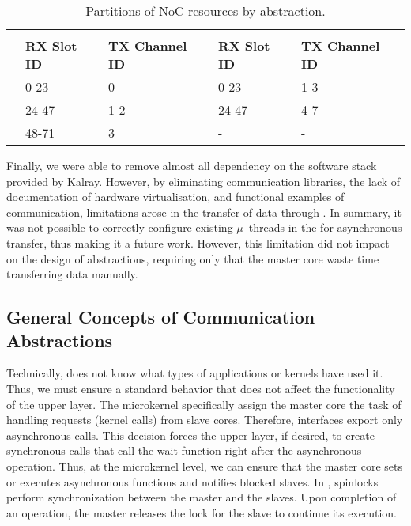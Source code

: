 			\begin{table}[!tb]
				\centering%
				\caption{Partitions of NoC resources by abstraction.}%
				\label{tab.noc-resources}%

				\begin{tabular}{l|l|l|l|l|}
					\cline{2-5}
															& \multicolumn{2}{c|}{\textbf{\cnoc}}          & \multicolumn{2}{c|}{\textbf{\dnoc}}          \\ \cline{2-5}
															& \textbf{RX Slot ID} & \textbf{TX Channel ID} & \textbf{RX Slot ID} & \textbf{TX Channel ID} \\ \hline
					\multicolumn{1}{|l|}{\textbf{\mailbox}} & 0-23                & 0                      & 0-23                & 1-3                    \\ \hline
					\multicolumn{1}{|l|}{\textbf{\portal}}  & 24-47               & 1-2                    & 24-47               & 4-7                    \\ \hline
					\multicolumn{1}{|l|}{\textbf{\sync}}    & 48-71               & 3                      & -                   & -                      \\ \hline
				\end{tabular}

			\end{table}

			Finally, we were able to remove almost all dependency on the software
			stack provided by Kalray. However, by eliminating communication
			libraries, the lack of documentation of hardware virtualisation,
			and functional examples of communication, limitations arose
			in the transfer of data through \dnoc. In summary, it was not possible
			to correctly configure existing $\mu$~threads in the \dma for asynchronous
			transfer, thus making it a future work. However, this limitation did not
			impact on the design of abstractions, requiring only that the master
			core waste time transferring data manually.

		\subsection{General Concepts of Communication Abstractions}
		\label{sec.general-concepts}

			Technically, \nanvix \hal does not know what types of applications
			or kernels have used it. Thus, we must ensure a standard behavior
			that does not affect the functionality of the upper layer. The
			microkernel specifically assign the master core the task
			of handling requests (\ie kernel calls) from slave cores. Therefore,
			interfaces export only asynchronous calls. This decision forces
			the upper layer, if desired, to create synchronous calls that
			call the wait function right after the asynchronous operation.
			Thus, at the microkernel level, we can ensure that the
			master core
			sets or executes asynchronous functions and notifies blocked
			slaves. In \mppa, spinlocks perform synchronization between the
			master and the slaves. Upon completion of an operation, the master
			releases the lock for the slave to continue its execution.

